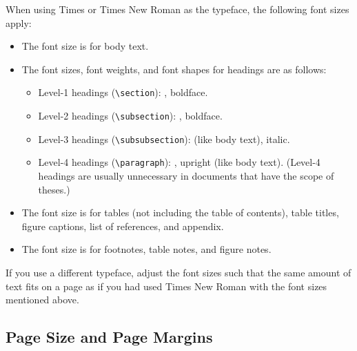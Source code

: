 When using Times or Times New Roman as the typeface, the following font sizes apply:
\begin{itemize}
	\item The font size is \printlength{\fsnormal} for body text.
	\item The font sizes, font weights, and font shapes for headings are as follows:
		\begin{itemize}
			\item Level-1 headings (\verb|\section|): \printlength{\fsLarge}, boldface.
			\item Level-2 headings (\verb|\subsection|): \printlength{\fslarge}, boldface.
			\item Level-3 headings (\verb|\subsubsection|): \printlength{\fsnormal} (like body text), italic.
			\item Level-4 headings (\verb|\paragraph|): \printlength{\fsnormal}, upright (like body text). (Level-4 headings are usually unnecessary in documents that have the scope of theses.)
		\end{itemize}
	\item The font size is \printlength{\fssmall} for tables (not including the table of contents), table titles, figure captions, list of references, and appendix.
	\item The font size is \printlength{\fsfootnote} for footnotes, table notes, and figure notes.
\end{itemize}

If you use a different typeface, adjust the font sizes such that the same amount of text fits on a page as if you had used Times New Roman with the font sizes mentioned above.

\subsection{Page Size and Page Margins}

